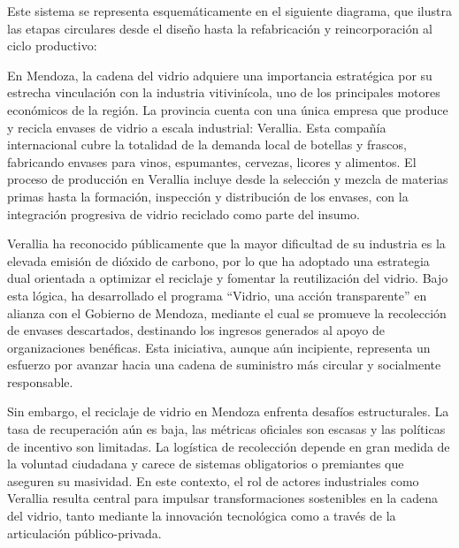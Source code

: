 Este sistema se representa esquemáticamente en el siguiente diagrama, que ilustra las etapas circulares desde el diseño hasta la refabricación y reincorporación al ciclo productivo:


En Mendoza, la cadena del vidrio adquiere una importancia estratégica por su estrecha vinculación con la industria vitivinícola, uno de los principales motores económicos de la región. La provincia cuenta con una única empresa que produce y recicla envases de vidrio a escala industrial: Verallia. Esta compañía internacional cubre la totalidad de la demanda local de botellas y frascos, fabricando envases para vinos, espumantes, cervezas, licores y alimentos. El proceso de producción en Verallia incluye desde la selección y mezcla de materias primas hasta la formación, inspección y distribución de los envases, con la integración progresiva de vidrio reciclado como parte del insumo.

Verallia ha reconocido públicamente que la mayor dificultad de su industria es la elevada emisión de dióxido de carbono, por lo que ha adoptado una estrategia dual orientada a optimizar el reciclaje y fomentar la reutilización del vidrio. Bajo esta lógica, ha desarrollado el programa “Vidrio, una acción transparente” en alianza con el Gobierno de Mendoza, mediante el cual se promueve la recolección de envases descartados, destinando los ingresos generados al apoyo de organizaciones benéficas. Esta iniciativa, aunque aún incipiente, representa un esfuerzo por avanzar hacia una cadena de suministro más circular y socialmente responsable.

Sin embargo, el reciclaje de vidrio en Mendoza enfrenta desafíos estructurales. La tasa de recuperación aún es baja, las métricas oficiales son escasas y las políticas de incentivo son limitadas. La logística de recolección depende en gran medida de la voluntad ciudadana y carece de sistemas obligatorios o premiantes que aseguren su masividad. En este contexto, el rol de actores industriales como Verallia resulta central para impulsar transformaciones sostenibles en la cadena del vidrio, tanto mediante la innovación tecnológica como a través de la articulación público-privada.

